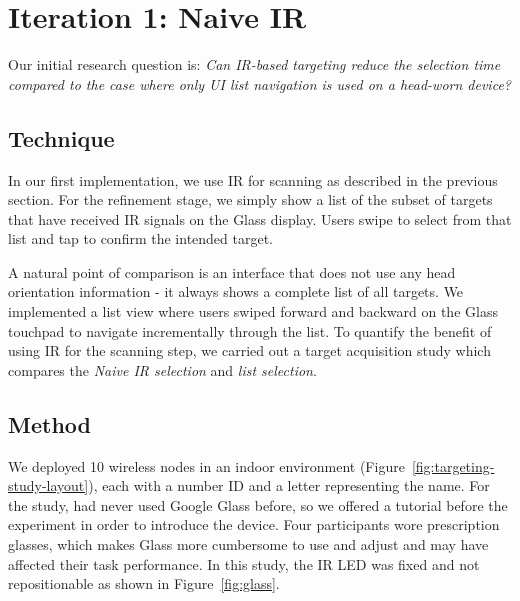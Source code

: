 
\section{Iteration 1: Naive IR}
Our initial research question is: {\em Can IR-based targeting reduce the selection time compared to the case where only UI list navigation is used on a head-worn device?} 

\newpage
\subsection{Technique}
In our first implementation, we use IR for scanning as described in the previous section. For the refinement stage, we simply show a list of the subset of targets that have received IR signals on the Glass display. Users swipe to select from that list and tap to confirm the intended target.

A natural point of comparison is an interface that does not use any head orientation information - it always shows a complete list of all targets. We implemented a list view where users swiped forward and backward on the Glass touchpad to navigate incrementally through the list. To quantify the benefit of using IR for the scanning step, we carried out a target acquisition study which compares the {\em Naive IR selection} and {\em list selection}.  

\subsection{Method}
We deployed 10 wireless nodes in an indoor environment (Figure~\ref{fig:targeting-study-layout}), each with a number ID and a letter representing the name. For the study,     had never used Google Glass before, so we offered a tutorial before the experiment in order to introduce the device. Four participants wore prescription glasses, which makes Glass more cumbersome to use and adjust and may have affected their task performance. In this study, the IR LED was fixed and not repositionable as shown in Figure~\ref{fig:glass}.

